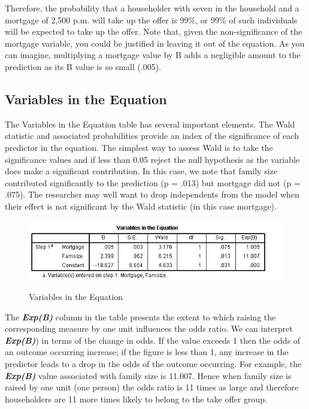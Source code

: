 \documentclass[a4paper,12pt]{article}
\begin{document}
Therefore, the probability that a householder with seven in the household and a mortgage of 2,500 p.m. will take up the offer is 99\%, or 99\% of such individuals will be
expected to take up the offer.
Note that, given the non-significance of the mortgage variable, you could be justified
in leaving it out of the equation. As you can imagine, multiplying a mortgage value by
B adds a negligible amount to the prediction as its B value is so small (.005).
\newpage

\subsection{Variables in the Equation}
The Variables in the Equation table has several important elements. The Wald statistic and associated probabilities provide an index of the significance of each predictor in the equation.
The simplest way to assess Wald is to take the significance values and if less
than 0.05 reject the null hypothesis as the variable does make a significant contribution.
In this case, we note that family size contributed significantly to the prediction
(p = .013) but mortgage did not (p = .075). The researcher may well want to drop
independents from the model when their effect is not significant by the Wald statistic
(in this case mortgage).

\begin{figure}
	\begin{center}
		\includegraphics[scale=0.6]{images/Logistic8}\\
		\caption{Variables in the Equation}
	\end{center}
\end{figure}

The \textbf{\textit{Exp(B)}} column in the table presents the extent to which raising the corresponding measure by one unit influences the odds ratio. We can interpret \textbf{\textit{Exp(B)}}) in
terms of the change in odds. If the value exceeds 1 then the odds of an outcome occurring increase; if the figure is less than 1, any increase in the predictor leads to a drop in
the odds of the outcome occurring. For example, the \textbf{\textit{Exp(B)}} value associated with
family size is 11.007. Hence when family size is raised by one unit (one person) the
odds ratio is 11 times as large and therefore householders are 11 more times likely to
belong to the take offer group.
\end{document}
